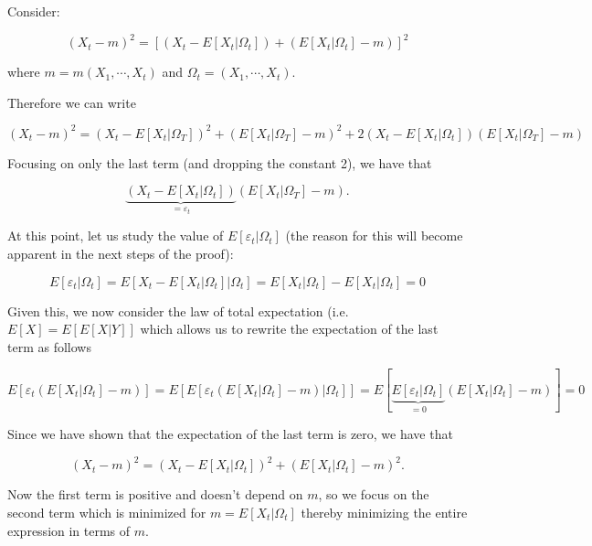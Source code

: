 \documentclass[]{book}
\theoremstyle{definition}
\theoremstyle{definition}
\theoremstyle{definition}
\theoremstyle{remark}
\begin{document}
Consider:

\[{\left( {{X_t} - m} \right)^2} = {\left[ {\left( {{X_t} - E\left[ {{X_t}|{\Omega _t}} \right]} \right) + \left( {E\left[ {{X_t}|{\Omega _t}} \right] - m} \right)} \right]^2}\]

where \(m = m\left( {{X_{1}}, \cdots ,{X_{t}}} \right)\) and
\({\Omega _t} = \left( {{X_{1}}, \cdots ,{X_{t}}} \right)\).

Therefore we can write

\[{\left( {{X_t} - m} \right)^2} = {\left( {{X_t} - E\left[ {{X_t}|{\Omega _T}} \right]} \right)^2} + {\left( {E\left[ {{X_t}|{\Omega _T}} \right] - m} \right)^2} + 2\left( {{X_t} - E\left[ {{X_t}|{\Omega _t}} \right]} \right)\left( {E\left[ {{X_t}|{\Omega _T}} \right] - m} \right)\]

Focusing on only the last term (and dropping the constant 2), we have
that

\[\underbrace {\left( {{X_t} - E\left[ {{X_t}|{\Omega _t}} \right]} \right)}_{ = {\varepsilon _t}}\left( {E\left[ {{X_t}|{\Omega _T}} \right] - m} \right).\]

At this point, let us study the value of
\(E\left[ {{\varepsilon _t}|{\Omega _t}} \right]\) (the reason for this
will become apparent in the next steps of the proof):

\[E\left[ {{\varepsilon _t}|{\Omega _t}} \right] = E\left[ {{X_t} - E\left[ {{X_t}|{\Omega _t}} \right]|{\Omega _t}} \right] = E\left[ {{X_t}|{\Omega _t}} \right] - E\left[ {{X_t}|{\Omega _t}} \right] = 0\]

Given this, we now consider the law of total expectation (i.e.
\(E[X] = E[E[X|Y]]\) which allows us to rewrite the expectation of the
last term as follows

\[E\left[ {{\varepsilon _t}\left( {E\left[ {{X_t}|{\Omega _t}} \right] - m} \right)} \right] = E\left[ {E\left[ {{\varepsilon _t}\left( {E\left[ {{X_t}|{\Omega _t}} \right] - m} \right)|{\Omega _t}} \right]} \right] = E\left[ {\underbrace {E\left[ {{\varepsilon _t}|{\Omega _t}} \right]}_{ = 0}\left( {E\left[ {{X_t}|{\Omega _t}} \right] - m} \right)} \right] = 0\]

Since we have shown that the expectation of the last term is zero, we
have that

\[{\left( {{X_t} - m} \right)^2} = {\left( {{X_t} - E\left[ {{X_t}|{\Omega _t}} \right]} \right)^2} + {\left( {E\left[ {{X_t}|{\Omega _t}} \right] - m} \right)^2}.\]

Now the first term is positive and doesn't depend on \(m\), so we focus
on the second term which is minimized for
\(m = E\left[ {{X_t}|{\Omega _t}} \right]\) thereby minimizing the
entire expression in terms of \(m\). \blacksquare
\end{document}
